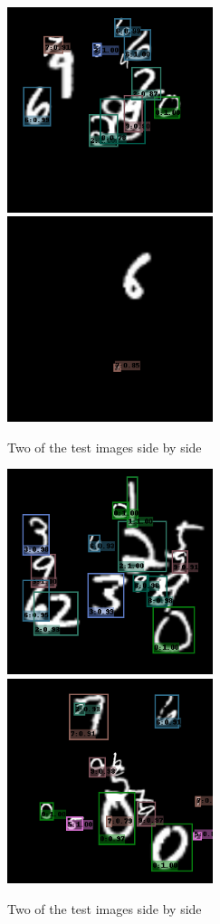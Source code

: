 \documentclass{article}
\begin{document}
\begin{figure}[H]%
    \centering
    {{\includegraphics[width=6cm]{Assignments/Assignment_4/plots/8.png} }}%
    \qquad
    {{\includegraphics[width=6cm]{Assignments/Assignment_4/plots/9.png} }}%
    \caption{Two of the test images side by side}%
    \label{fig:test4}%
\end{figure}


\begin{figure}[H]%
    \centering
    {{\includegraphics[width=6cm]{Assignments/Assignment_4/plots/10.png} }}%
    \qquad
    {{\includegraphics[width=6cm]{Assignments/Assignment_4/plots/11.png} }}%
    \caption{Two of the test images side by side}%
    \label{fig:test5}%
\end{figure}
\end{document}
